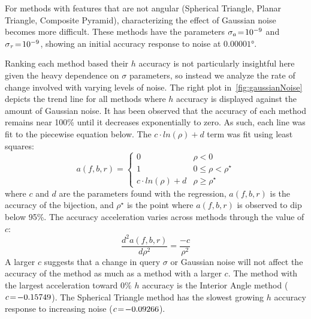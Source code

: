 For methods with features that are not angular (Spherical Triangle, Planar Triangle, Composite Pyramid),
characterizing the effect of Gaussian noise becomes more difficult.
These methods have the parameters $\sigma_a \!=\! 10^{-9}$ and $\sigma_\tau \!=\! 10^{-9}$, showing an initial
accuracy response to noise at $\ang{0.00001}$.

Ranking each method based their $h$ accuracy is not particularly insightful here given the heavy dependence on
$\sigma$ parameters, so instead we analyze the rate of change involved with varying levels of noise.
The right plot in~\autoref{fig:gaussianNoise} depicts the trend line for all methods where $h$ accuracy is displayed
against the amount of Gaussian noise.
It has been observed that the accuracy of each method remains near 100\% until it decreases exponentially to zero.
As such, each line was fit to the piecewise equation below.
The $c\cdot \mathit{ln}(\rho) + d$ term was fit using least squares:
\begin{equation}
    a(f, b, r) =
    \begin{cases}
        0 & \rho < 0 \\
        1 & 0 \leq \rho < \rho^{\star} \\
        c \cdot \mathit{ln}(\rho) + d & \rho \geq \rho^{\star}
    \end{cases}
\end{equation}
where $c$ and $d$ are the parameters found with the regression, $a(f, b, r)$ is the accuracy of the bijection, and
$\rho^{\star}$ is the point where $a(f, b, r)$ is observed to dip below 95\%.
The accuracy acceleration varies across methods through the value of $c$:
\begin{equation}
    \frac{d^{2}a(f, b, r)}{d\rho^2} = \frac{-c}{\rho^2}
\end{equation}
A larger $c$ suggests that a change in query $\sigma$ or Gaussian noise will not affect the accuracy of the method
as much as a method with a larger $c$.
The method with the largest acceleration toward $0\%$ $h$ accuracy is the Interior Angle method ($c \!=\! -0.15749$).
The Spherical Triangle method has the slowest growing $h$ accuracy response to increasing noise ($c \!=\! -0.09266$).

